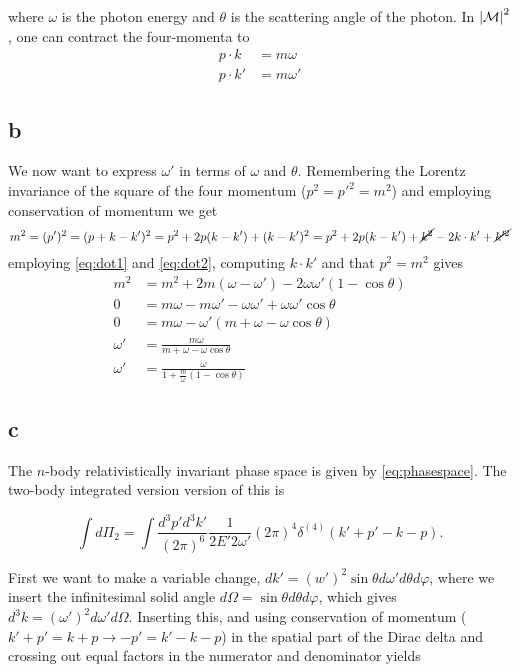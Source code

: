 \documentclass[11pt, a4paper]{amsart}
\begin{document}
where $\omega$ is the photon energy and $\theta$ is the scattering angle of the photon. In $\abs{\mathcal{M}}^2$, one can contract the four-momenta to
\begin{align}
p \cdot k \   &= m \omega \label{eq:dot1}\\
p \cdot k' &= m \omega' \label{eq:dot2}
\end{align}

\subsection{b}
We now want to express $\omega'$ in terms of $\omega$ and $\theta$. Remembering the Lorentz invariance of the square of the four momentum ($p^2 = p'^2 = m^2$) and employing conservation of momentum we get
\begin{equation}
m^2 = (p')^2 = (p + k - k')^2 = p^2 + 2p(k-k') + (k -k')^2 = p^2 + 2p(k-k') + \cancel{k^2} - 2k\cdot k' + \cancel{k'^2}
\end{equation}
employing \autoref{eq:dot1} and \autoref{eq:dot2}, computing $k\cdot k'$ and that $p^2 = m^2$ gives
\begin{align}
  m^2 &= m^2 + 2m(\omega - \omega') - 2\omega\omega'(1 - \cos \theta) \nonumber \\
       0 &= m\omega -m\omega' - \omega\omega' + \omega\omega'\cos \theta \nonumber \\
       0 &=m\omega - \omega'(m + \omega - \omega\cos\theta) \nonumber \\
       \omega' &= \frac{m\omega}{m + \omega - \omega\cos\theta} \nonumber \\
       \omega' &= \frac{\omega}{1 + \frac{m}{\omega}(1-\cos\theta)} \label{eq:omegaprime}
\end{align}

\subsection{c}
The $n$-body relativistically invariant phase space is given by \autoref{eq:phasespace}. The two-body integrated version version of this is

\begin{equation}
\int d\Pi_2 = \int \frac{d^3p' d^3k'}{(2\pi)^6} \frac{1}{2E'2\omega'} (2\pi)^4 \delta^{(4)}(k' + p' - k - p).
\end{equation}

First we want to make a variable change, $dk' = (w')^2\sin\theta d\omega' d\theta d\varphi$, where we insert the infinitesimal solid angle $d\Omega = \sin\theta d\theta d\varphi$, which gives $d^3k = (\omega')^2 d\omega' d\Omega$. Inserting this, and using conservation of momentum ($k' + p' = k + p \rightarrow -p' = k' - k -p$)  in the spatial part of the Dirac delta and crossing out equal factors in the numerator and denominator yields
\end{document}
